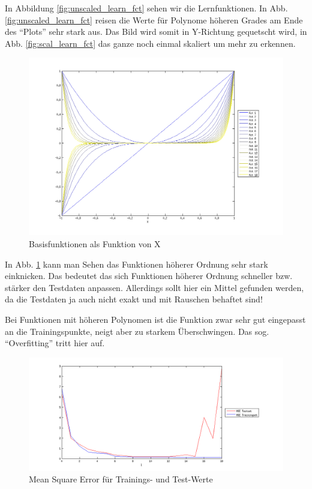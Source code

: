 In Abbildung \ref{fig:unscaled_learn_fct} sehen wir die Lernfunktionen.
In Abb. \ref{fig:unscaled_learn_fct} reisen die Werte für Polynome höheren Grades am Ende des ``Plots'' sehr stark aus.
 Das Bild wird somit in Y-Richtung gequetscht wird, in Abb. \ref{fig:scal_learn_fct} das ganze noch einmal skaliert um mehr zu erkennen.

\begin{figure}[hp!]
\begin{center}
 \includegraphics[width=1\textwidth]{./figures/1_1_1_base_fct}
 \caption[Basisfunktionen als Funktion von X]{Basisfunktionen als Funktion von X}
\label{fig:base_fct}
\end{center}
\end{figure}
In Abb. \ref{fig:base_fct} kann man Sehen das Funktionen höherer Ordnung sehr stark einknicken. Das bedeutet das sich Funktionen höherer Ordnung 
schneller bzw. stärker den Testdaten anpassen. Allerdings sollt hier ein Mittel gefunden werden, da die Testdaten ja auch nicht exakt und mit
Rauschen behaftet sind! 



Bei Funktionen mit höheren Polynomen ist die Funktion zwar sehr gut eingepasst an die Trainingspunkte, neigt aber zu starkem Überschwingen.
Das sog. ``Overfitting'' tritt hier auf.
\clearpage

\begin{figure}[hp!]
\begin{center}
 \includegraphics[width=1\textwidth]{./figures/1_1_1_MSE}
 \caption[Mean Square Error]{Mean Square Error für Trainings- und Test-Werte}
\label{fig:MSE}
\end{center}
\end{figure}

